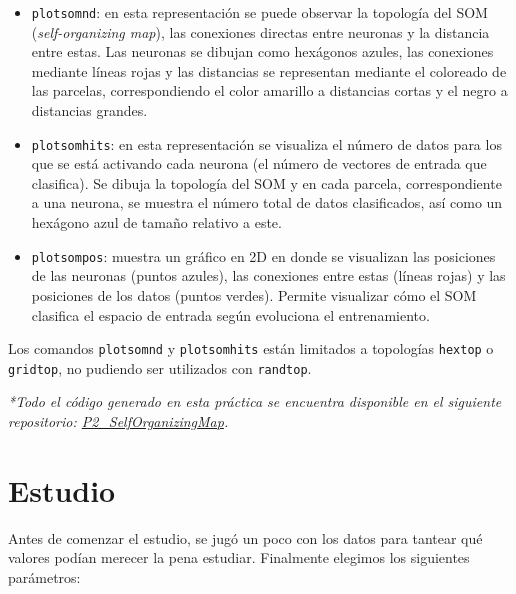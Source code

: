 \documentclass[a4paper,12pt,titlepage]{article}
\begin{document}
\begin{itemize}[noitemsep]
	\item \lstinline|plotsomnd|: en esta representación se puede observar la topología del SOM (\textit{self-organizing map}), las conexiones directas entre neuronas y la distancia entre estas. Las neuronas se dibujan como hexágonos azules, las conexiones mediante líneas rojas y las distancias se representan mediante el coloreado de las parcelas, correspondiendo el color amarillo a distancias cortas y el negro a distancias grandes. \citep{matlab:plotsomnd}
	\item \lstinline|plotsomhits|: en esta representación se visualiza el número de datos para los que se está activando cada neurona (el número de vectores de entrada que clasifica). Se dibuja la topología del SOM y en cada parcela, correspondiente a una neurona, se muestra el número total de datos clasificados, así como un hexágono azul de tamaño relativo a este. \citep{matlab:plotsomhits}
	\item \lstinline|plotsompos|: muestra un gráfico en 2D en donde se visualizan las posiciones de las neuronas (puntos azules), las conexiones entre estas (líneas rojas) y las posiciones de los datos (puntos verdes). Permite visualizar cómo el SOM clasifica el espacio de entrada según evoluciona el entrenamiento. \citep{matlab:plotsompos}
\end{itemize}

Los comandos \lstinline|plotsomnd| y \lstinline|plotsomhits| están limitados a topologías \lstinline|hextop| o \lstinline|gridtop|, no pudiendo ser utilizados con \lstinline|randtop|. 

\emph{*Todo el código generado en esta práctica se encuentra disponible en el siguiente repositorio: 
\href{https://github.com/davidmigloz/neuronal-networks/tree/master/P2\_SelfOrganizingMap}{P2\_SelfOrganizingMap}.}

\section{Estudio}

Antes de comenzar el estudio, se jugó un poco con los datos para tantear qué valores podían merecer la pena estudiar. Finalmente elegimos los siguientes parámetros:
\end{document}
